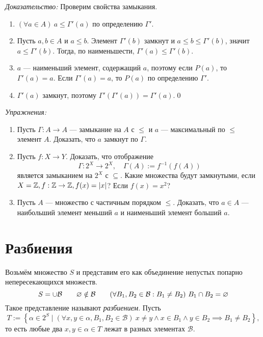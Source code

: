   {\it Доказательство:}
Проверим свойства замыкания.
\begin{enumerate}
  \item{}$(\forall a\in A)~a\leq \Gamma'(a)$ по определению $\Gamma'$.

  \item{}Пусть $a,b\in A$ и $a\leq b$. Элемент $\Gamma'(b)$ замкнут и
  $a\leq b\leq\Gamma'(b)$, значит $a\leq\Gamma'(b)$. Тогда, по наименьшести,
  $\Gamma'(a)\leq\Gamma'(b)$.

  \item{}$a$ --- наименьший элемент, содержащий $a$, поэтому
  если $P(a)$, то $\Gamma'(a)=a$. Если $\Gamma'(a)=a$, то $P(a)$
  по определению $\Gamma'$.

  \item{}$\Gamma'(a)$ замкнут, поэтому $\Gamma'(\Gamma'(a))=\Gamma'(a)$.\qed
\end{enumerate}

{\it Упражнения:}
\begin{enumerate}
  \item{}Пусть $\Gamma:A\to A$ --- замыкание на $A$ с $\leq$ и $a$ ---
  максимальный по $\leq$ элемент $A$. Доказать, что $a$ замкнут по $\Gamma$.
  \item{}Пусть $f:X\to Y$. Доказать, что отображение
  \[
    \Gamma:2^{X}\to 2^{X},\quad \Gamma(A):= f^{-1}(f(A))
  \]
  является замыканием на $2^{X}$ с $\subseteq$. Какие множества
  будут замкнутыми, если $X=\mathbb Z,f:\mathbb Z\to \mathbb Z,f(x)=|x|$? Если $f(x)=x^{2}$?
  \item{}Пусть $A$ --- множество с частичным порядком $\leq$.
  Доказать, что $a\in A$ --- наибольший элемент меньший $a$
  и наименьший элемент больший $a$.
\end{enumerate}

\section{Разбиения}

\newcommand\B{\mathcal B}
Возьмём множество $S$ и представим его как объединение непустых
попарно непересекающихся множеств.
\[
  S=\cup\B\qquad
  \eset\notin\B\qquad
  (\forall B_1,B_2\in\B:B_1\neq B_2)~B_1\cap B_2=\eset
\]
Такое представление называют {\it разбиением}. Пусть
\[
  T:=\left\{\alpha\in 2^{S}\;\big|\; (\forall x,y\in\alpha,B_1,B_2\in\B)~
  x\neq y\land	x\in B_1\land y\in B_2\implies B_1\neq B_2\right\},
\]
то есть любые два $x,y\in \alpha\in T$ лежат в разных
элементах $\B$.

